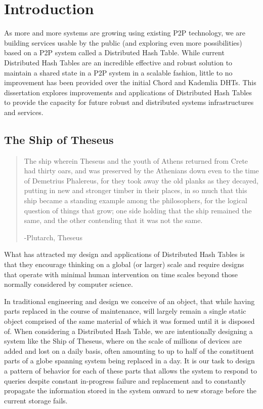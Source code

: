 





\chapter{Introduction}

As more and more systems are growing using existing P2P technology, we are building services usable by the public (and exploring even more possibilities) based on a P2P system called a Distributed Hash Table.
While current Distributed Hash Tables are an incredible effective and robust solution to maintain a shared state in a P2P system in a scalable fashion, little to no improvement has been provided over the initial Chord\cite{chord} and Kademlia\cite{kademlia} DHTs.
This dissertation explores improvements and applications of Distributed Hash Tables to provide the capacity for future robust and distributed systems infrastructures and services.

\section{The Ship of Theseus}

\blockquote{The ship wherein Theseus and the youth of Athens returned from Crete had thirty oars, and was preserved by the Athenians down even to the time of Demetrius Phalereus, for they took away the old planks as they decayed, putting in new and stronger timber in their places, in so much that this ship became a standing example among the philosophers, for the logical question of things that grow; one side holding that the ship remained the same, and the other contending that it was not the same.

-Plutarch, Theseus

}


What has attracted my design and applications of Distributed Hash Tables is that they encourage thinking on a global (or larger) scale and require designs that operate with minimal human intervention on time scales beyond those normally considered by computer science.

In traditional engineering and design we conceive of an object, that while having parts replaced in the course of maintenance, will largely remain a single static object comprised of the same material of which it was formed until it is disposed of.
When considering a Distributed Hash Table, we are intentionally designing a system like the Ship of Theseus, where on the scale of millions of devices are added and lost on a daily basis, often amounting to up to half of the constituent parts of a globe spanning system being replaced in a day.
It is our task to design a pattern of behavior for each of these parts that allows the system to respond to queries despite constant in-progress failure and replacement and to constantly propagate the information stored in the system onward to new storage before the current storage fails. 

